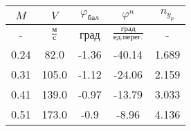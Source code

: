 \begin{tabular}{|c|c|c|c|c|}
\hline
$M$ & $V$ & $\varphi_{бал}$ & $\varphi^{n}$ & $n_{y_{p}}$ \\ 
\hline
- & $\frac{м}{с}$ & град & $\frac{град}{ед.перег.}$ & - \\ 
\hline
0.24 & 82.0 & -1.36 & -40.14 & 1.689 \\ 
\hline
0.31 & 105.0 & -1.12 & -24.06 & 2.159 \\ 
\hline
0.41 & 139.0 & -0.97 & -13.79 & 3.033 \\ 
\hline
0.51 & 173.0 & -0.9 & -8.96 & 4.136 \\ 
\hline
\end{tabular}